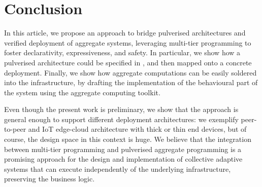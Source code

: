 \section{Conclusion}
\label{conclusion}
In this article, we propose an approach 
 to bridge pulverised architectures 
 and verified deployment of aggregate systems,
leveraging multi-tier programming to foster 
 declarativity, expressiveness, and safety. 
%
In particular, we show how a pulverised architecture could be specified in \scalaloci{},
and then mapped onto a concrete deployment.
%
Finally, we show how aggregate computations can be easily soldered into the infrastructure,
by drafting the implementation of the behavioural part of the system using the \scafi{} aggregate computing toolkit.

Even though the present work is preliminary,
we show that the approach is general enough to support different deployment architectures:
we exemplify peer-to-peer and IoT edge-cloud architecture with thick or thin end devices,
but of course, the design space in this context is huge.
%
We believe that the integration between multi-tier programming and pulverised aggregate programming is a promising approach for the design and implementation of collective adaptive systems that can execute independently of the underlying infrastructure,
preserving the business logic.

\printbibliography

